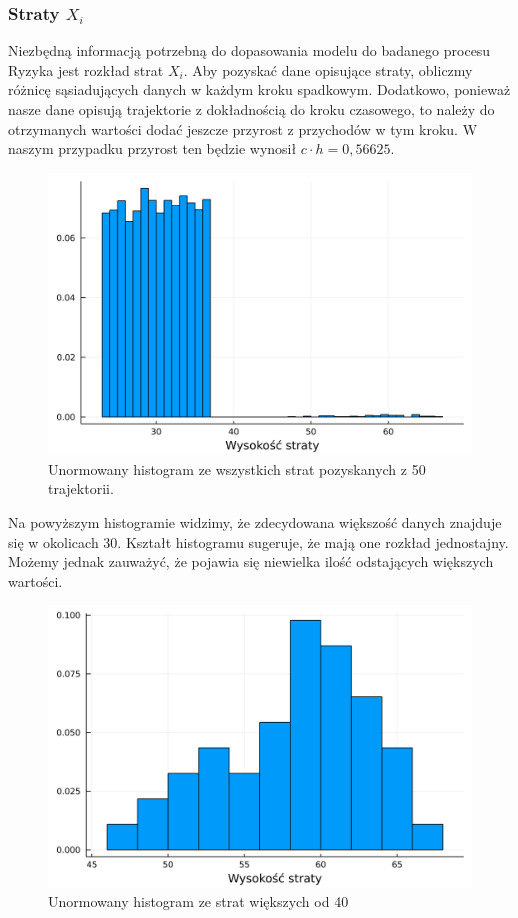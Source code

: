 \documentclass[12pt]{mwart}
\begin{document}
	\subsubsection{Straty {\boldmath $X_i$}}
	\noindent Niezbędną informacją potrzebną do dopasowania modelu do badanego procesu Ryzyka jest rozkład strat $X_i$. Aby pozyskać dane opisujące straty, obliczmy różnicę sąsiadujących danych w każdym kroku spadkowym. Dodatkowo, ponieważ nasze dane opisują trajektorie z dokładnością do kroku czasowego, to należy do otrzymanych wartości dodać jeszcze przyrost z przychodów w tym kroku. W naszym przypadku przyrost ten będzie wynosił $c \cdot h = 0,56625$.
	
	\begin{figure}[H]
		\centering
		\includegraphics[scale=0.1]{fig/straty_1.png}
		\caption{Unormowany histogram ze wszystkich strat pozyskanych z 50 trajektorii.}
	\end{figure}

	\noindent Na powyższym histogramie widzimy, że zdecydowana większość danych znajduje się w okolicach 30. Kształt histogramu sugeruje, że mają one rozkład jednostajny. Możemy jednak zauważyć, że pojawia się niewielka ilość odstających większych wartości.
	
	\begin{figure}[H]
		\centering
		\includegraphics[scale=0.1]{fig/straty_2.png}
		\caption{Unormowany histogram ze strat większych od 40}
	\end{figure}
\end{document}
